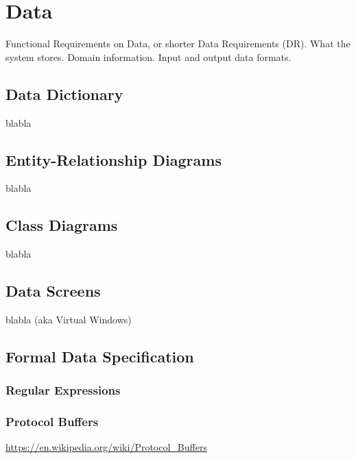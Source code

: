 
\chapter{Data}%

Functional Requirements on Data, or shorter Data Requirements (DR). What the system stores. Domain information. Input and output data formats.

\section{Data Dictionary}
blabla

\section{Entity-Relationship Diagrams}
blabla

\section{Class Diagrams}
blabla

\section{Data Screens}
blabla  (aka Virtual Windows)

\section{Formal Data Specification}%

\subsection{Regular Expressions}

\subsection{Protocol Buffers}

\url{https://en.wikipedia.org/wiki/Protocol_Buffers}
